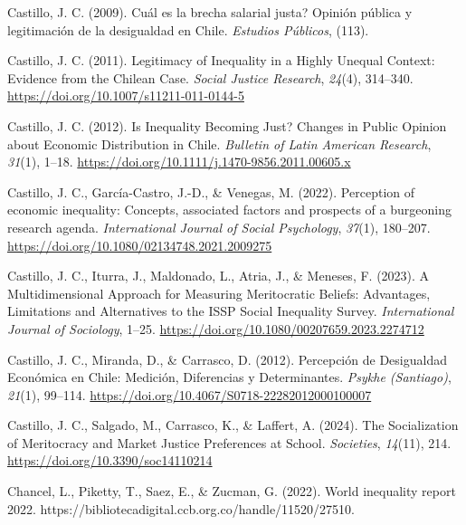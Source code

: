 \documentclass[
  12pt,
]{article}
\newlength{\cslhangindent}
\newenvironment{CSLReferences}[2] %
 {\begin{list}{}{%
  \setlength{\itemindent}{0pt}
  \setlength{\leftmargin}{0pt}
  \setlength{\parsep}{0pt}
  \ifodd #1
   \setlength{\leftmargin}{\cslhangindent}
   \setlength{\itemindent}{-1\cslhangindent}
  \fi
  \setlength{\itemsep}{#2\baselineskip}}}
 {\end{list}}
\begin{document}
\begin{CSLReferences}{1}{0}
Castillo, J. C. (2009). {{\textquestiondown}Cu{á}l es la brecha salarial
justa? Opini{ó}n p{ú}blica y legitimaci{ó}n de la desigualdad en Chile}.
\emph{Estudios P{ú}blicos}, (113).

Castillo, J. C. (2011). Legitimacy of {Inequality} in a {Highly Unequal
Context}: {Evidence} from the {Chilean Case}. \emph{Social Justice
Research}, \emph{24}(4), 314--340.
\url{https://doi.org/10.1007/s11211-011-0144-5}

Castillo, J. C. (2012). Is {Inequality Becoming Just}? {Changes} in
{Public Opinion} about {Economic Distribution} in {Chile}.
\emph{Bulletin of Latin American Research}, \emph{31}(1), 1--18.
\url{https://doi.org/10.1111/j.1470-9856.2011.00605.x}

Castillo, J. C., García-Castro, J.-D., \& Venegas, M. (2022). Perception
of economic inequality: Concepts, associated factors and prospects of a
burgeoning research agenda. \emph{International Journal of Social
Psychology}, \emph{37}(1), 180--207.
\url{https://doi.org/10.1080/02134748.2021.2009275}

Castillo, J. C., Iturra, J., Maldonado, L., Atria, J., \& Meneses, F.
(2023). A {Multidimensional Approach} for {Measuring Meritocratic
Beliefs}: {Advantages}, {Limitations} and {Alternatives} to the {ISSP
Social Inequality Survey}. \emph{International Journal of Sociology},
1--25. \url{https://doi.org/10.1080/00207659.2023.2274712}

Castillo, J. C., Miranda, D., \& Carrasco, D. (2012). Percepci{ó}n de
{Desigualdad Econ{ó}mica} en {Chile}: {Medici{ó}n}, {Diferencias} y
{Determinantes}. \emph{Psykhe (Santiago)}, \emph{21}(1), 99--114.
\url{https://doi.org/10.4067/S0718-22282012000100007}

Castillo, J. C., Salgado, M., Carrasco, K., \& Laffert, A. (2024). The
{Socialization} of {Meritocracy} and {Market Justice Preferences} at
{School}. \emph{Societies}, \emph{14}(11), 214.
\url{https://doi.org/10.3390/soc14110214}

Chancel, L., Piketty, T., Saez, E., \& Zucman, G. (2022). World
inequality report 2022.
https://bibliotecadigital.ccb.org.co/handle/11520/27510.


\end{CSLReferences}
\end{document}
